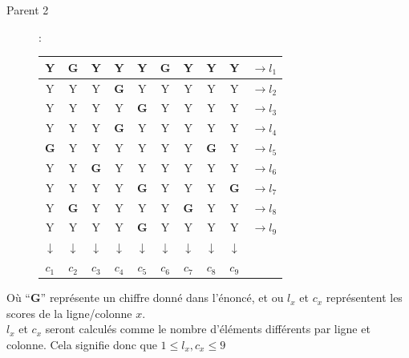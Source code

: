 \begin{description}
                        \item[Parent 2]:\\
                            \begin{center}
                                \begin{tabular}{|c|c|c| |c|c|c| |c|c|c| |l}
                                    \hline
                                    Y&\textbf{G}&Y&Y&Y&\textbf{G}&Y&Y&Y&$\rightarrow l_1$\\
                                    \hline
                                    Y&Y&Y&\textbf{G}&Y&Y&Y&Y&Y&$\rightarrow l_2$\\
                                    \hline
                                    Y&Y&Y&Y&\textbf{G}&Y&Y&Y&Y&$\rightarrow l_3$\\
                                    \hline
                                    \hline
                                    Y&Y&Y&\textbf{G}&Y&Y&Y&Y&Y&$\rightarrow l_4$\\
                                    \hline
                                    \textbf{G}&Y&Y&Y&Y&Y&Y&\textbf{G}&Y&$\rightarrow l_5$\\
                                    \hline
                                    Y&Y&\textbf{G}&Y&Y&Y&Y&Y&Y&$\rightarrow l_6$\\
                                    \hline
                                    \hline
                                    Y&Y&Y&Y&\textbf{G}&Y&Y&Y&\textbf{G}&$\rightarrow l_7$\\
                                    \hline
                                    Y&\textbf{G}&Y&Y&Y&Y&\textbf{G}&Y&Y&$\rightarrow l_8$\\
                                    \hline
                                    Y&Y&Y&Y&\textbf{G}&Y&Y&Y&Y&$\rightarrow l_9$\\
                                    \hline
                                    \hline
                                    $\downarrow$&$\downarrow$&$\downarrow$&$\downarrow$&$\downarrow$&$\downarrow$&$\downarrow$&$\downarrow$&$\downarrow$&\\
                                    $c_1$&$c_2$&$c_3$&$c_4$&$c_5$&$c_6$&$c_7$&$c_8$&$c_9$&\\
                                \end{tabular}
                            \end{center}
                    \end{description}
                    Où ``\textbf{G}'' représente un chiffre donné dans l'énoncé, et ou $l_x$ et $c_x$ représentent les scores de la ligne/colonne $x$.\\
                    $l_x$ et $c_x$ seront calculés comme le nombre d'éléments différents par ligne et colonne. Cela signifie donc que $1\leq l_x, c_x\leq 9$\\

